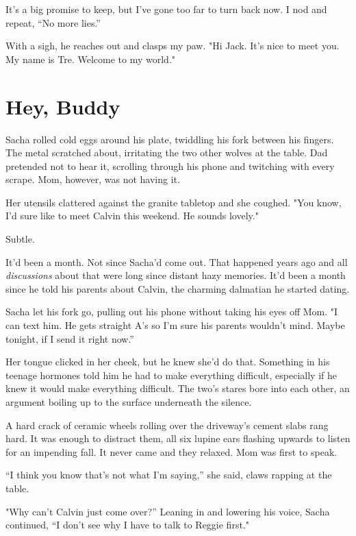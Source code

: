 It's a big promise to keep, but I've gone too far to turn back now. I
nod and repeat, ``No more lies.''

With a sigh, he reaches out and clasps my paw. "Hi Jack. It's nice to
meet you. My name is Tre. Welcome to my world."

\chapter*{Hey, Buddy}

Sacha rolled cold eggs around his plate, twiddling his fork
between his fingers. The metal scratched about, irritating the two other
wolves at the table. Dad pretended not to hear it, scrolling through his
phone and twitching with every scrape. Mom, however, was not having
it.

Her utensils clattered against the granite tabletop and she
coughed. "You know, I'd sure like to meet Calvin this weekend. He sounds
lovely."

Subtle.

It'd been a month. Not since Sacha'd come
out. That happened years ago and all \emph{discussions} about that were
long since distant hazy memories. It'd been a month since he told his
parents about Calvin, the charming dalmatian he started
dating.

Sacha let his fork go, pulling out his phone without taking
his eyes off Mom. "I can text him. He gets straight A's so I'm sure his
parents wouldn't mind. Maybe tonight, if I send it right
now.''

Her tongue clicked in her cheek, but he knew she'd do that.
Something in his teenage hormones told him he had to make everything
difficult, especially if he knew it would make everything difficult. The
two's stares bore into each other, an argument boiling up to the surface
underneath the
silence.

A hard crack of ceramic wheels rolling over the driveway's
cement slabs rang hard. It was enough to distract them, all six lupine
ears flashing upwards to listen for an impending fall. It never came and
they relaxed. Mom was first to
speak.

``I think you know that's not what I'm saying,'' she said,
claws rapping at the
table.

"Why can't Calvin just come over?'' Leaning in and lowering
his voice, Sacha continued, ``I don't see why I have to talk to Reggie
first."

